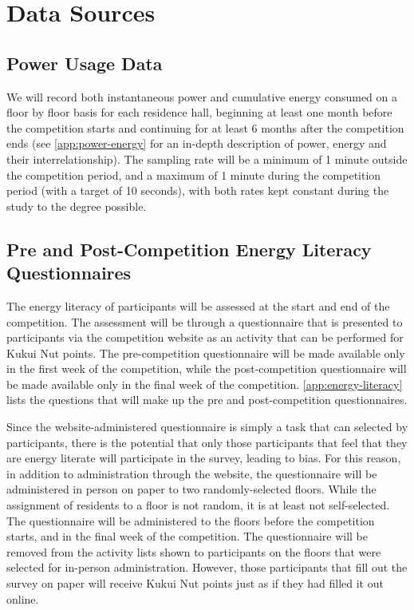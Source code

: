 \section{Data Sources}

\subsection{Power Usage Data}
\label{sec:power-usage-data}

We will record both instantaneous power and cumulative energy consumed on a floor by floor basis for each residence hall, beginning at least one month before the competition starts and continuing for at least 6 months after the competition ends (see \autoref{app:power-energy} for an in-depth description of power, energy and their interrelationship). The sampling rate will be a minimum of 1 minute outside the competition period, and a maximum of 1 minute during the competition period (with a target of 10 seconds), with both rates kept constant during the study to the degree possible.

\subsection{Pre and Post-Competition Energy Literacy Questionnaires}
\label{sec:exp-literacy-questionnaire}

The energy literacy of participants will be assessed at the start and end of the competition. The assessment will be through a questionnaire that is presented to participants via the competition website as an activity that can be performed for Kukui Nut points. The pre-competition questionnaire will be made available only in the first week of the competition, while the post-competition questionnaire will be made available only in the final week of the competition. \autoref{app:energy-literacy} lists the questions that will make up the pre and post-competition questionnaires.

Since the website-administered questionnaire is simply a task that can selected by participants, there is the potential that only those participants that feel that they are energy literate will participate in the survey, leading to bias. For this reason, in addition to administration through the website, the questionnaire will be administered in person on paper to two randomly-selected floors. While the assignment of residents to a floor is not random, it is at least not self-selected. The questionnaire will be administered to the floors before the competition starts, and in the final week of the competition. The questionnaire will be removed from the activity lists shown to participants on the floors that were selected for in-person administration. However, those participants that fill out the survey on paper will receive Kukui Nut points just as if they had filled it out online.

